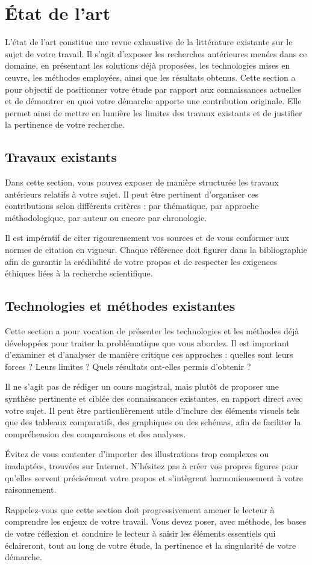 \chapter{État de l'art}

L'état de l'art constitue une revue exhaustive de la littérature existante sur le sujet de votre travail. Il s'agit d'exposer les recherches antérieures menées dans ce domaine, en présentant les solutions déjà proposées, les technologies mises en œuvre, les méthodes employées, ainsi que les résultats obtenus. Cette section a pour objectif de positionner votre étude par rapport aux connaissances actuelles et de démontrer en quoi votre démarche apporte une contribution originale. Elle permet ainsi de mettre en lumière les limites des travaux existants et de justifier la pertinence de votre recherche.

\section{Travaux existants}

Dans cette section, vous pouvez exposer de manière structurée les travaux antérieurs relatifs à votre sujet. Il peut être pertinent d'organiser ces contributions selon différents critères : par thématique, par approche méthodologique, par auteur ou encore par chronologie.

Il est impératif de citer rigoureusement vos sources et de vous conformer aux normes de citation en vigueur. Chaque référence doit figurer dans la bibliographie afin de garantir la crédibilité de votre propos et de respecter les exigences éthiques liées à la recherche scientifique.

\section{Technologies et méthodes existantes}

Cette section a pour vocation de présenter les technologies et les méthodes déjà développées pour traiter la problématique que vous abordez. Il est important d'examiner et d'analyser de manière critique ces approches : quelles sont leurs forces ? Leurs limites ? Quels résultats ont-elles permis d'obtenir ?

Il ne s'agit pas de rédiger un cours magistral, mais plutôt de proposer une synthèse pertinente et ciblée des connaissances existantes, en rapport direct avec votre sujet. Il peut être particulièrement utile d'inclure des éléments visuels tels que des tableaux comparatifs, des graphiques ou des schémas, afin de faciliter la compréhension des comparaisons et des analyses.

Évitez de vous contenter d'importer des illustrations trop complexes ou inadaptées, trouvées sur Internet. N'hésitez pas à créer vos propres figures pour qu'elles servent précisément votre propos et s'intègrent harmonieusement à votre raisonnement.

Rappelez-vous que cette section doit progressivement amener le lecteur à comprendre les enjeux de votre travail. Vous devez poser, avec méthode, les bases de votre réflexion et conduire le lecteur à saisir les éléments essentiels qui éclaireront, tout au long de votre étude, la pertinence et la singularité de votre démarche.